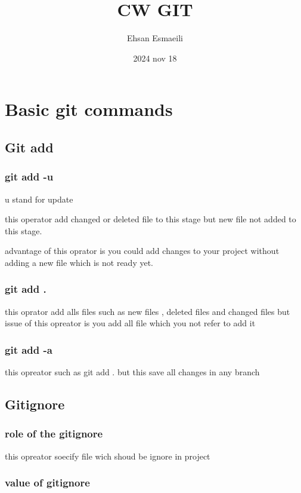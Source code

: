 \documentclass{article}
\title{CW GIT}
\date{2024 nov 18}
\author{Ehsan Esmaeili}
\begin{document}
\maketitle
\newpage

\section*{Basic git commands}

\subsection{Git add}

\subsubsection*{git add -u}

   u stand for update

this operator add changed or deleted file to 
this stage but new file not added to this stage.

advantage of this oprator is you could add changes to your
 project without  adding a new file which is not ready yet.
\subsubsection*{git add .}

this oprator add alls files such as new files 
, deleted files and changed files but issue of 
this opreator is you add all file which you not refer to add it 

\subsubsection*{git add -a}

this opreator such as git add . but this save all changes in any branch

\subsection{Gitignore}


\subsubsection*{role of the gitignore}
this opreator soecify file wich shoud be ignore in project

\subsubsection*{value of gitignore}
\end{document}
